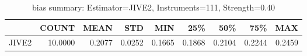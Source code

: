 \begin{table}[ht]
\centering
\caption{bias summary: Estimator=JIVE2, Instruments=111, Strength=0.40}
\begin{tabular}{lrrrrrrrr}
\toprule
 & COUNT & MEAN & STD & MIN & 25\% & 50\% & 75\% & MAX \\
\midrule
JIVE2 & 10.0000 & 0.2077 & 0.0252 & 0.1665 & 0.1868 & 0.2104 & 0.2244 & 0.2459 \\
\bottomrule
\end{tabular}
\end{table}
